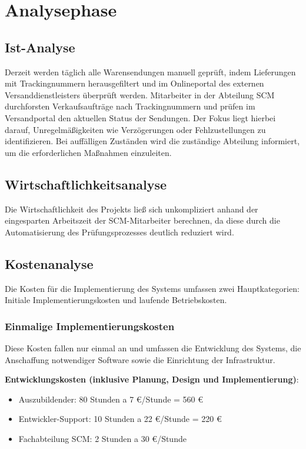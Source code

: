 \section{Analysephase} 
\label{sec:Analysephase}

\subsection{Ist-Analyse} 
\label{sec:IstAnalyse}
Derzeit werden täglich alle Warensendungen manuell geprüft, indem Lieferungen mit Trackingnummern 
herausgefiltert und im Onlineportal des externen Versanddienstleisters überprüft werden. 
Mitarbeiter in der Abteilung \ac{SCM} durchforsten Verkaufsaufträge nach 
Trackingnummern und prüfen im Versandportal den aktuellen Status der Sendungen. Der Fokus liegt 
hierbei darauf, Unregelmäßigkeiten wie Verzögerungen oder Fehlzustellungen zu identifizieren. 
Bei auffälligen Zuständen wird die zuständige Abteilung informiert, um die erforderlichen Maßnahmen einzuleiten.

\subsection{Wirtschaftlichkeitsanalyse}
\label{sec:Wirtschaftlichkeitsanalyse}
Die Wirtschaftlichkeit des Projekts ließ sich unkompliziert anhand der eingesparten Arbeitszeit der SCM-Mitarbeiter berechnen, 
da diese durch die Automatisierung des Prüfungsprozesses deutlich reduziert wird.


\subsection{Kostenanalyse}
\label{sec:Kostenanalyse}
Die Kosten für die Implementierung des Systems umfassen zwei Hauptkategorien: 
Initiale Implementierungskosten und laufende Betriebskosten.

\subsubsection{Einmalige Implementierungskosten}
\label{sec:Implementierungskosten}

Diese Kosten fallen nur einmal an und umfassen die Entwicklung des Systems, 
die Anschaffung notwendiger Software sowie die Einrichtung der Infrastruktur.

	\textbf{Entwicklungskosten (inklusive Planung, Design und Implementierung)}:
    \begin{itemize}
        \item Auszubildender: 80 Stunden a 7 €/Stunde = 560 €
        \item Entwickler-Support: 10 Stunden a 22 €/Stunde = 220 €
        \item Fachabteilung SCM: 2 Stunden a 30 €/Stunde
    \end{itemize}
    \clearpage

